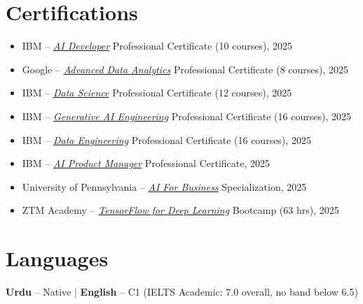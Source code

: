 \documentclass[11pt,a4paper]{article}
\begin{document}
\section*{Certifications}
\begin{itemize}
    \item IBM -- \href{https://www.coursera.org/account/accomplishments/professional-cert/AUXO12A3KUE7}{\textit{AI Developer}} Professional Certificate (10 courses), 2025
    \item Google -- \href{https://www.coursera.org/account/accomplishments/professional-cert/RS5PNGTXG6GM}{\textit{Advanced Data Analytics}} Professional Certificate (8 courses), 2025
    \item IBM -- \href{https://www.coursera.org/account/accomplishments/professional-cert/YW8F4AT9VNBD}{\textit{Data Science}} Professional Certificate (12 courses), 2025
    \item IBM -- \href{https://www.coursera.org/account/accomplishments/professional-cert/55VL0VUWMJYK}{\textit{Generative AI Engineering}} Professional Certificate (16 courses), 2025
    \item IBM -- \href{https://www.coursera.org/account/accomplishments/professional-cert/IRVGNYDPKGG4}{\textit{Data Engineering}} Professional Certificate (16 courses), 2025
    \item IBM -- \href{https://www.coursera.org/account/accomplishments/professional-cert/5B224YFNDQF3}{\textit{AI Product Manager}} Professional Certificate, 2025
    \item University of Pennsylvania -- \href{https://www.coursera.org/account/accomplishments/specialization/JJ0I3RVGIP70}{\textit{AI For Business}} Specialization, 2025
    \item ZTM Academy -- \href{https://www.udemy.com/certificate/UC-80e47528-e137-4eaf-ba36-501e0a499f72/}{\textit{TensorFlow for Deep Learning}} Bootcamp (63 hrs), 2025
\end{itemize}

\section*{Languages}
\textbf{Urdu} -- Native \quad $\vert$ \quad \textbf{English} -- C1 (IELTS Academic: 7.0 overall,
no band below 6.5)
\end{document}
